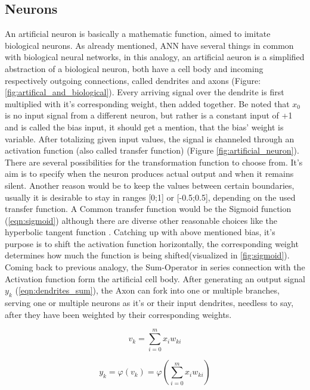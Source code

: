 \subsection{Neurons}
An artificial neuron is basically a mathematic function, aimed to imitate biological neurons.
As already mentioned, ANN have several things in common with biological neural networks, in this analogy, an artificial aeuron is a simplified abstraction of a biological neuron, both have a cell body and incoming respectively outgoing connections, called dendrites and axons \cite{nntutorial} (Figure: \ref{fig:artifical_and_biological}). Every arriving signal over the dendrite is first multiplied with it's corresponding weight, then added together. Be noted that $x_{0}$ is no input signal from a different neuron, but rather is a constant input of +1 and is called the bias input, it should get a mention, that the bias' weight is variable. \newline
After totalizing given input values, the signal is channeled through an activation function (also called transfer function) (Figure \ref{fig:artificial_neuron}). There are several possibilities for the transformation function to choose from. It's aim is to specify when the neuron produces actual output and when it remains silent. Another reason would be to keep the values between certain boundaries, usually it is desirable to stay in ranges [0;1] or [-0.5;0.5], depending on the used transfer function. A Common transfer function would be the Sigmoid function (\ref{eqn:sigmoid}) although there are diverse other reasonable choices like the hyperbolic tangent function \cite{nntutorial}. Catching up with above mentioned bias, it's purpose is to shift the activation function horizontally, the corresponding weight determines how much the function is being shifted(visualized in \ref{fig:sigmoid}). Coming back to previous analogy, the Sum-Operator in series connection with the Activation function form the artificial cell body.\newline 
After generating an output signal $y_{k}$ (\ref{eqn:dendrites_sum}), the Axon can fork into one or multiple branches, serving one or multiple neurons as it's or their input dendrites, needless to say,  after they have been weighted by their corresponding weights.   


\begin{equation}
\label{eqn:vk}
	v_{k} = \sum_{i=0}^{m} x_{i} w_{ki}
\end{equation}  

\begin{equation}
	\label{eqn:dendrites_sum}
	y_{k} = \varphi(v_{k}) = \varphi(\sum_{i=0}^{m} x_{i} w_{ki}) 
\end{equation} 

